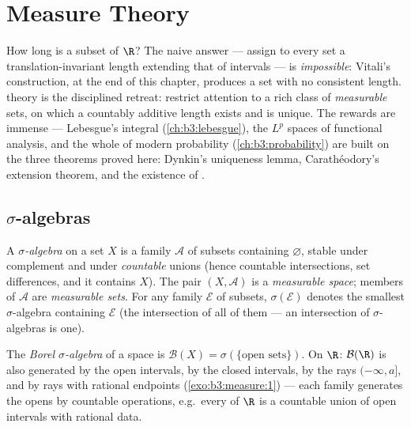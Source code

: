 \chapter{Measure Theory}\label{ch:b3:measure}

How long is a subset of $\R$? The naive answer --- assign to
every set a translation-invariant length extending that of
intervals --- is \emph{impossible}: Vitali's construction, at
the end of this chapter, produces a set with no consistent
length.  theory is the disciplined retreat: restrict
attention to a rich class of \emph{measurable} sets, on which a
countably additive length exists and is unique. The rewards are
immense --- Lebesgue's integral (\cref{ch:b3:lebesgue}), the
$L^p$ spaces of functional analysis, and the whole of modern
probability (\cref{ch:b3:probability}) are built on the three
theorems proved here: Dynkin's uniqueness lemma,
Carath\'eodory's extension theorem, and the existence of
.

\section{$\sigma$-algebras}

\begin{definition}\label{def:b3:measure:sigmaalgebra}
A \emph{$\sigma$-algebra}
on a set $X$ is a family $\mathcal A$ of subsets containing
$\varnothing$, stable under complement and under
\emph{countable} unions (hence countable intersections, set
differences, and it contains $X$). The pair $(X, \mathcal A)$
is a \emph{measurable space}; members of $\mathcal A$ are
\emph{measurable sets}. For any family $\mathcal E$ of subsets,
$\sigma(\mathcal E)$ denotes the smallest $\sigma$-algebra
containing $\mathcal E$ (the intersection of all of them ---
an intersection of $\sigma$-algebras is one).
\end{definition}

\begin{definition}\label{def:b3:measure:borel}
The \emph{Borel $\sigma$-algebra} of a  space is
$\mathcal B(X) = \sigma(\{\text{open sets}\})$. On $\R$:
$\mathcal B(\R)$ is also generated by the open intervals, by
the closed intervals, by the rays $(-\infty, a]$, and by rays
with rational endpoints (\cref{exo:b3:measure:1}) --- each
family generates the opens by countable operations, e.g.\
every  of $\R$ is a countable union of open intervals
with rational data.
\end{definition}


